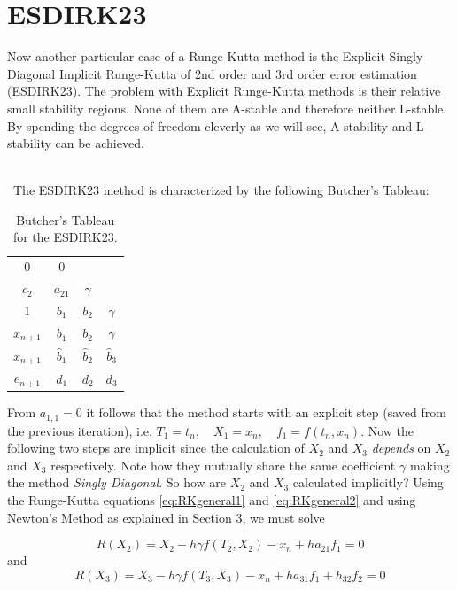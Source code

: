 \section{ESDIRK23}
Now another particular case of a Runge-Kutta method is the Explicit Singly Diagonal Implicit Runge-Kutta of 2nd order and 3rd order error estimation (ESDIRK23). The problem with Explicit Runge-Kutta methods is their relative small stability regions. None of them are A-stable and therefore neither L-stable. By spending the degrees of freedom cleverly as we will see, A-stability and L-stability can be achieved.

\\\
The ESDIRK23 method is characterized by the following Butcher's Tableau:


\begin{table}[H]
    \centering
\begin{tabular}{c|ccc}
0 & 0 & & \\
$c_{2}$ & $a_{21}$ & $\gamma$ & \\
1 & $b_{1}$ & $b_{2}$ & $\gamma$ \\
\hline$x_{n+1}$ & $b_{1}$ & $b_{2}$ & $\gamma$ \\
$\hat{x}_{n+1}$ & $\hat{b}_{1}$ & $\hat{b}_{2}$ & $\hat{b}_{3}$ \\
\hline$e_{n+1}$ & $d_{1}$ & $d_{2}$ & $d_{3}$
\end{tabular}
    \caption{Butcher's Tableau for the ESDIRK23.}
    \label{tab:ESDIRK23general}
\end{table}

From $a_{1,1} = 0$ it follows that the method starts with an explicit step (saved from the previous iteration), i.e. $T_{1}=t_{n}, \quad X_{1}=x_{n}, \quad f_1 = f(t_n, x_n)$. Now the following two steps are implicit since the calculation of $X_2$ and $X_3$ \textit{depends} on $X_2$ and $X_3$ respectively. Note how they mutually share the same coefficient $\gamma$ making the method \textit{Singly Diagonal}. So how are $X_2$ and $X_3$ calculated implicitly? Using the Runge-Kutta equations \ref{eq:RKgeneral1} and \ref{eq:RKgeneral2} and using Newton's Method as explained in Section 3, we must solve

\begin{equation}
R\left(X_{2}\right)=X_{2}-h \gamma f\left(T_{2}, X_{2}\right)-x_{n}+h a_{21} f_{1}=0
\end{equation}
and
\begin{equation}
R\left(X_{3}\right)=X_{3}-h \gamma f\left(T_{3}, X_{3}\right)-x_{n}+h a_{31} f_{1}+h_{32} f_{2}=0
\end{equation}

